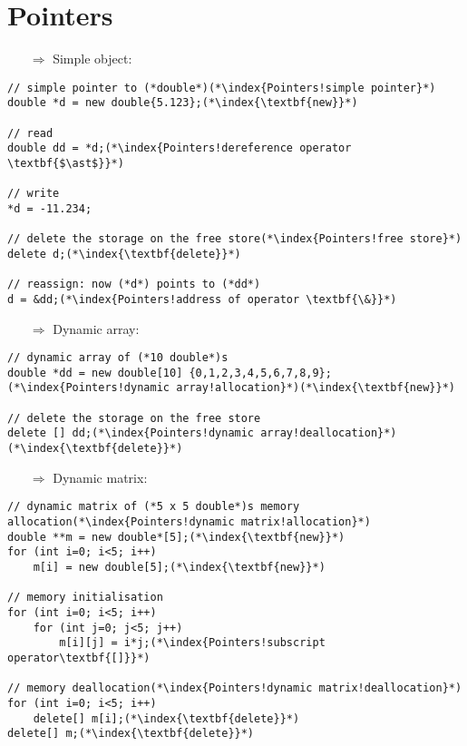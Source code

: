 \documentclass[10pt]{article}
\begin{document}
\section{Pointers}
\small
\begin{enumerate}
\item[$\Rightarrow$] Simple object:
\end{enumerate}
\begin{lstlisting}
// simple pointer to (*double*)(*\index{Pointers!simple pointer}*)
double *d = new double{5.123};(*\index{\textbf{new}}*)

// read
double dd = *d;(*\index{Pointers!dereference operator \textbf{$\ast$}}*)

// write
*d = -11.234;

// delete the storage on the free store(*\index{Pointers!free store}*)
delete d;(*\index{\textbf{delete}}*)

// reassign: now (*d*) points to (*dd*)
d = &dd;(*\index{Pointers!address of operator \textbf{\&}}*)
\end{lstlisting}
\begin{enumerate}
\item[$\Rightarrow$] Dynamic array:
\end{enumerate}
\begin{lstlisting}
// dynamic array of (*10 double*)s
double *dd = new double[10] {0,1,2,3,4,5,6,7,8,9};(*\index{Pointers!dynamic array!allocation}*)(*\index{\textbf{new}}*)

// delete the storage on the free store
delete [] dd;(*\index{Pointers!dynamic array!deallocation}*)(*\index{\textbf{delete}}*)
\end{lstlisting}
\begin{enumerate}
\item[$\Rightarrow$] Dynamic matrix:
\end{enumerate}
\begin{lstlisting}
// dynamic matrix of (*5 x 5 double*)s memory allocation(*\index{Pointers!dynamic matrix!allocation}*)
double **m = new double*[5];(*\index{\textbf{new}}*)
for (int i=0; i<5; i++)
    m[i] = new double[5];(*\index{\textbf{new}}*)

// memory initialisation    
for (int i=0; i<5; i++)
    for (int j=0; j<5; j++)
        m[i][j] = i*j;(*\index{Pointers!subscript operator\textbf{[]}}*)

// memory deallocation(*\index{Pointers!dynamic matrix!deallocation}*)
for (int i=0; i<5; i++)
    delete[] m[i];(*\index{\textbf{delete}}*)
delete[] m;(*\index{\textbf{delete}}*)
\end{lstlisting}
\end{document}
